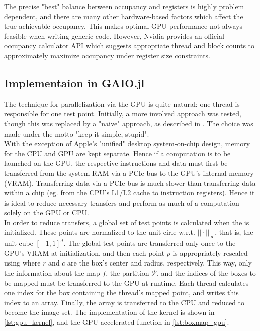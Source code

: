 The precise "best" balance between occupancy and registers is highly problem dependent, 
and there are many other hardware-based factors which affect the true achievable occupancy. 
This makes optimal GPU performance not always feasible when writing generic code. However, 
Nvidia provides an official occupancy calculator API which suggests appropriate thread 
and block counts to approximately maximize occupancy under register size constraints. 


\subsection{Implementaion in GAIO.jl}

The technique for parallelization via the GPU is quite natural: one thread is responsible 
for one test point. Initially, a more involved approach was tested, though this 
was replaced by a "naive" approach, as described in \cite*{naivegpu,solvercomp}. The 
choice was made under the motto "keep it simple, stupid". \\

With the exception of Apple's "unified" desktop system-on-chip design, memory for the CPU 
and GPU are kept separate. Hence if a computation is to be launched on the GPU, the 
respective instructions and data must first be transferred from the system 
RAM via a PCIe bus to the GPU's internal memory (VRAM). Transferring data via a 
PCIe bus is much slower than transferring data within a chip (eg. from the CPU's L1/L2 
cache to instruction registers). Hence it is ideal to reduce necessary transfers and 
perform as much of a computation solely on the GPU or CPU. \\

In order to reduce transfers, a global set of test points is calculated when the 
 is initialized. These points are normalized to the unit cirle w.r.t. 
$|| \cdot ||_\infty$, that is, the unit cube $[-1,1]^d$. The global test points are 
transferred only once to the GPU's VRAM at initialization, and then each point $p$ is appropriately rescaled 
using  where $r$ and $c$ are the box's center and radius, respectively. 
This way, only the information about the 
map $f$, the partition $\mathcal{P}$, and the indices of the boxes to be mapped must be 
transferred to the GPU at runtime. Each thread calculates one index for the box containing 
the thread's mapped point, and writes this index to an array. Finally, the array is 
transferred to the CPU and reduced to become the image set. The implementation of the 
kernel is shown in \autoref{lst:gpu_kernel}, and the GPU accelerated 
function in \autoref{lst:boxmap_gpu}. \\

